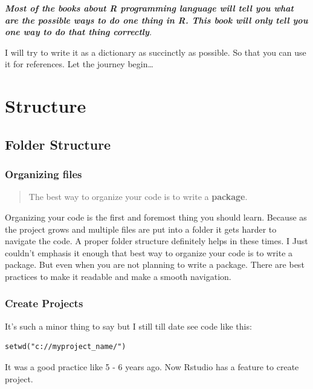 \documentclass[
]{book}
\begin{document}
\emph{\textbf{Most of the books about R programming language will tell you what are the possible ways to do one thing in R. This book will only tell you one way to do that thing correctly}.}

I will try to write it as a dictionary as succinctly as possible. So that you can use it for references. Let the journey begin\ldots{}

\hypertarget{part-structure}{%
\part{Structure}\label{part-structure}}

\hypertarget{folder}{%
\chapter{Folder Structure}\label{folder}}

\hypertarget{organizing-files}{%
\section{Organizing files}\label{organizing-files}}

\begin{quote}
The best way to organize your code is to write a \textbf{package}.
\end{quote}

Organizing your code is the first and foremost thing you should learn. Because as the project grows and multiple files are put into a folder it gets harder to navigate the code. A proper folder structure definitely helps in these times. I Just couldn't emphasis it enough that best way to organize your code is to write a package. But even when you are not planning to write a package. There are best practices to make it readable and make a smooth navigation.

\hypertarget{create-projects}{%
\section{Create Projects}\label{create-projects}}

It's such a minor thing to say but I still till date see code like this:

\begin{verbatim}
setwd("c://myproject_name/")
\end{verbatim}

It was a good practice like 5 - 6 years ago. Now Rstudio has a feature to create project.
\end{document}
